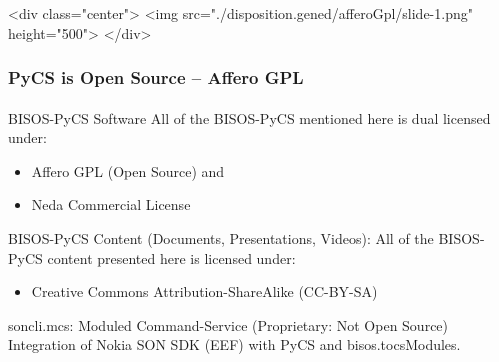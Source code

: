 \begin{htmlonly}

\begin{frame}[fragile,plain,label=afferoGpl]
    \frametitle{}
    \framesubtitle{}
    \begin{rawhtml}
<div class="center">
<img src="./disposition.gened/afferoGpl/slide-1.png" height="500">
</div>
    \end{rawhtml}
\end{frame}
\end{htmlonly}

\begin{verblatex}

\begin{frame}[fragile,plain,label=afferoGpl]
    \frametitle{PyCS is Open Source -- Affero GPL}
    \framesubtitle{}


    \begin{block}{BISOS-PyCS Software}
      All of the BISOS-PyCS mentioned here is dual licensed under:
      \begin{itemize}
        \item Affero GPL (Open Source) and
        \item Neda Commercial License
      \end{itemize}


    \end{block}

    \bigskip

    \begin{exampleblock}{BISOS-PyCS Content (Documents, Presentations, Videos):}
      All of the BISOS-PyCS content presented here is licensed under:
      \begin{itemize}
        \item Creative Commons Attribution-ShareAlike (CC-BY-SA)
      \end{itemize}
    \end{exampleblock}


    \begin{alertblock}{soncli.mcs: Moduled Command-Service  (Proprietary: Not Open Source)}
    \small{Integration of Nokia SON SDK (EEF) with PyCS and  bisos.tocsModules.}
    \end{alertblock}

\end{frame}
\end{verblatex}
